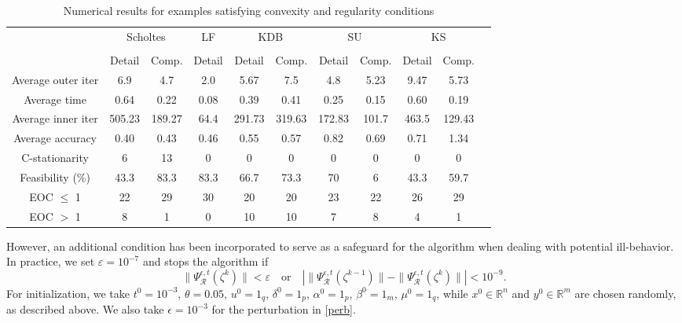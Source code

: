 \begin{table}[h]
   \centering
    \begin{tabular}{ccccccccccc}
         \toprule
          & \multicolumn{2}{c}{Scholtes} 
          & LF 
          & \multicolumn{2}{c}{KDB}
          & \multicolumn{2}{c}{SU}
          & \multicolumn{2}{c}{KS} \\
          \cline{2-3} \cline{5-6} \cline{7-8} \cline{9-10} \\
          & Detail & Comp. & Detail & Detail & Comp. & Detail & Comp. & Detail & Comp. \\
   \midrule 
   Average outer iter & 6.9 & 4.7 & 2.0 & 5.67 & 7.5 & 4.8 & 5.23 & 9.47 & 5.73 \\
   Average time & 0.64 & 0.22 & 0.08 & 0.39 & 0.41 & 0.25 & 0.15 & 0.60 & 0.19  \\
   Average inner iter & 505.23 & 189.27 & 64.4 & 291.73 & 319.63 & 172.83 & 101.7 & 463.5 & 129.43 \\
   Average accuracy & 0.40 & 0.43 & 0.46 & 0.55 & 0.57 & 0.82 & 0.69 & 0.71 & 1.34\\
   C-stationarity & 6 & 13 & 0 & 0 & 0 & 0 & 0 & 0 & 0 \\
   Feasibility (\%) & 43.3 & 83.3 & 83.3& 66.7 & 73.3 & 70& 6& 43.3 & 59.7 \\
   EOC $\leq$ 1 & 22 & 29 & 30 & 20& 20& 23 & 22& 26& 29 \\
   EOC $>$ 1& 8 & 1 & 0 & 10 & 10 & 7 & 8 & 4 & 1 \\
   \bottomrule
    \end{tabular}
    \caption{Numerical results for examples satisfying convexity and regularity conditions}
    \label{tab1}
\end{table}

However, an additional condition has been incorporated to serve as a safeguard for the algorithm when dealing with potential ill-behavior.
 In practice, we set $\varepsilon = 10^{-7}$ and stops the algorithm if
\[
\|\Psi^{\epsilon,t}_{\mathcal{R}}(\zeta^k)\| < \varepsilon \quad \mbox{or} \quad | \|\Psi^{\epsilon,t}_{\mathcal{R}}(\zeta^{k-1})\| - \|\Psi^{\epsilon,t}_{\mathcal{R}}(\zeta^{k})\| | < 10^{-9}.
\]
For initialization, we take $t^{0} = 10^{-3}$, $\theta = 0.05$, $u^0 = 1_q$, $\delta^0 = 1_p$, $\alpha^0 = 1_p$, $\beta^0 = 1_m$, $\mu^0 = 1_q$, while $x^0 \in \mathbb{R}^n$ and $y^0 \in \mathbb{R}^m$ are chosen randomly, as described above. We also take $\epsilon = 10^{-3}$ for the perturbation in \eqref{perb}.  
    
